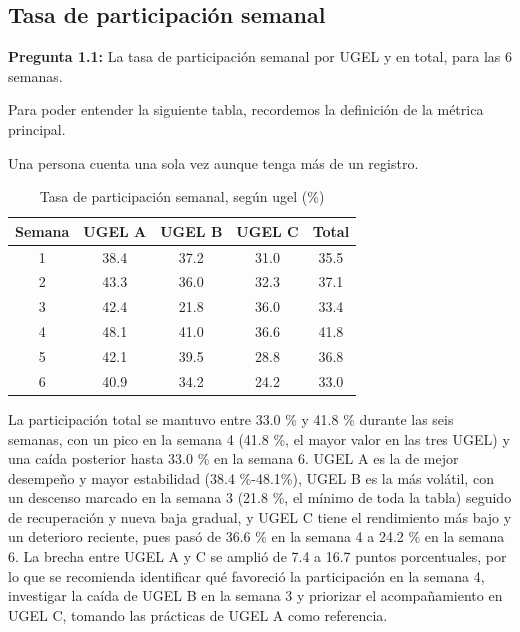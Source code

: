 \documentclass[12pt,a4paper]{article}
\begin{document}
		\subsection{Tasa de participación semanal}
			
			\noindent \textbf{Pregunta 1.1:} La tasa de participación semanal por UGEL y en total, para las 6 semanas.
			
			
			\noindent Para poder entender la siguiente tabla, recordemos la definición de la métrica principal.
		
			\begin{center}
				\setlength{\fboxsep}{6pt}
				\setlength{\fboxrule}{0.8pt}
			\end{center}
			
			\noindent Una persona cuenta una sola vez aunque tenga más de un registro. 
				
			\begin{table}[h]
				\centering
				\caption{Tasa de participación semanal, según ugel (\%)}
				\label{tab: tasa}
				\begin{tabular}{ccccc}
					\toprule
					Semana & UGEL A & UGEL B & UGEL C & Total \\
					\midrule
					1 & 38.4 & 37.2 & 31.0 & 35.5 \\
					2 & 43.3 & 36.0 & 32.3 & 37.1 \\
					3 & 42.4 & 21.8 & 36.0 & 33.4 \\
					4 & 48.1 & 41.0 & 36.6 & 41.8 \\
					5 & 42.1 & 39.5 & 28.8 & 36.8 \\
					6 & 40.9 & 34.2 & 24.2 & 33.0 \\
					\bottomrule
				\end{tabular}
			\end{table}
			
		\noindent La participación total se mantuvo entre 33.0 \% y 41.8 \% durante las seis semanas,
		con un pico en la semana 4 (41.8 \%, el mayor valor en las tres UGEL) y una caída posterior
		hasta 33.0 \% en la semana 6. UGEL A es la de mejor desempeño y mayor estabilidad (38.4 \%-48.1\%),
		UGEL B es la más volátil, con un descenso marcado en la semana 3 (21.8 \%, el mínimo de toda la tabla)
		seguido de recuperación y nueva baja gradual, y UGEL C tiene el rendimiento más bajo y un deterioro
		reciente, pues pasó de 36.6 \% en la semana 4 a 24.2 \% en la semana 6. La brecha entre UGEL A y C se
		amplió de 7.4 a 16.7 puntos porcentuales, por lo que se recomienda identificar qué favoreció la
		participación en la semana 4, investigar la caída de UGEL B en la semana 3 y priorizar el acompañamiento 
		en UGEL C, tomando las prácticas de UGEL A como referencia.
			
\end{document}
